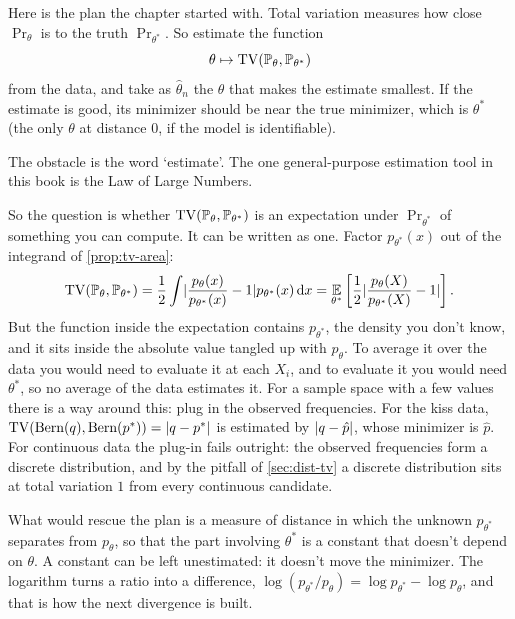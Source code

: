 Here is the plan the chapter started with.
Total variation measures how close $\Pr_\theta$ is to the truth $\Pr_{\theta^*}$.
So estimate the function
\[
\theta \mapsto \mathrm{TV}(\mathbb{P}_\theta, \mathbb{P}_{\theta^*})
\]
from the data, and take as $\hat{\theta}_n$ the $\theta$ that makes the estimate smallest.
If the estimate is good, its minimizer should be near the true minimizer, which is $\theta^*$ (the only $\theta$ at distance $0$, if the model is identifiable).

The obstacle is the word `estimate'.
The one general-purpose estimation tool in this book is the Law of Large Numbers.


So the question is whether $\mathrm{TV}(\mathbb{P}_\theta, \mathbb{P}_{\theta^*})$ is an expectation under $\Pr_{\theta^*}$ of something you can compute.
It can be written as one.
Factor $p_{\theta^*}(x)$ out of the integrand of \cref{prop:tv-area}:
\[
\mathrm{TV}(\mathbb{P}_\theta, \mathbb{P}_{\theta^*}) = \frac12 \int \lvert\frac{p_\theta(x)}{p_{\theta^*}(x)} - 1\rvert p_{\theta^*}(x) \, \mathrm{d}x = \operatorname*{\mathbb{E}}_{\theta^*}\left[ \frac12 \lvert\frac{p_\theta(X)}{p_{\theta^*}(X)} - 1\rvert \right].
\]
But the function inside the expectation contains $p_{\theta^*}$, the density you don't know, and it sits inside the absolute value tangled up with $p_\theta$.
To average it over the data you would need to evaluate it at each $X_i$, and to evaluate it you would need $\theta^*$, so no average of the data estimates it.
For a sample space with a few values there is a way around this: plug in the observed frequencies. For the kiss data, $\mathrm{TV}(\text{Bern}(q), \text{Bern}(p^*)) = \lvert q - p^*\rvert$ is estimated by $\lvert q - \hat{p}\rvert$, whose minimizer is $\hat{p}$.
For continuous data the plug-in fails outright: the observed frequencies form a discrete distribution, and by the pitfall of \cref{sec:dist-tv} a discrete distribution sits at total variation $1$ from every continuous candidate.

What would rescue the plan is a measure of distance in which the unknown $p_{\theta^*}$ separates from $p_\theta$, so that the part involving $\theta^*$ is a constant that doesn't depend on $\theta$.
A constant can be left unestimated: it doesn't move the minimizer.
The logarithm turns a ratio into a difference, $\log(p_{\theta^*}/p_\theta) = \log p_{\theta^*} - \log p_\theta$, and that is how the next divergence is built.

